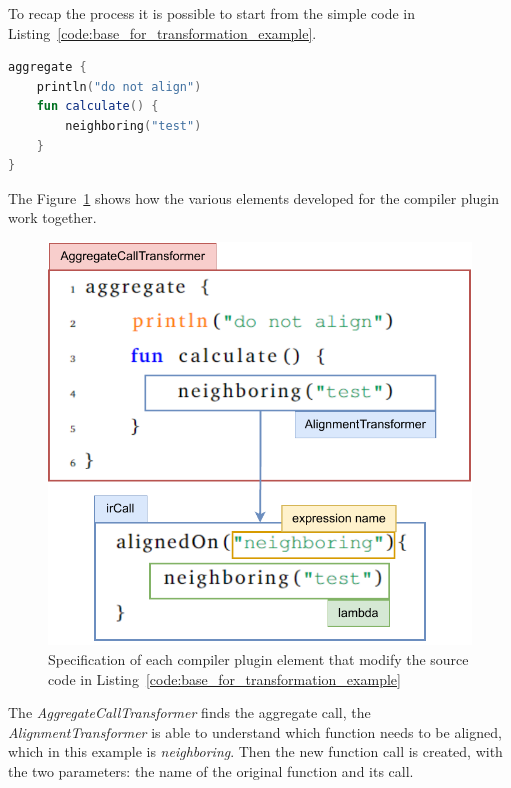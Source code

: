 To recap the process it is possible to start from the simple code in Listing~\ref{code:base_for_transformation_example}.
\begin{lstlisting}[caption={Base example of aggregate program}, captionpos=b, language=Kotlin, label={code:base_for_transformation_example}]
aggregate {
    println("do not align")
    fun calculate() {
        neighboring("test")
    }
}
\end{lstlisting}
The Figure~\ref{fig:ir_trasformation_with_code_elements} shows how the various elements developed for the compiler plugin work together.
\begin{figure}[!ht]
    \centering
    \includegraphics[scale=0.9]{document/chapters/3-alignment/images/ir_trasformation_with_code_elements.pdf}
    \caption{Specification of each compiler plugin element that modify the source code in Listing~\ref{code:base_for_transformation_example}}
    \label{fig:ir_trasformation_with_code_elements}
\end{figure}
The \textit{AggregateCallTransformer} finds the aggregate call, the \textit{AlignmentTransformer} is able to understand which function needs to be aligned, which in this example is \textit{neighboring}. Then the new function call is created, with the two parameters: the name of the original function and its call.

